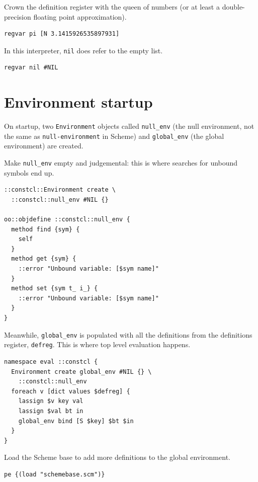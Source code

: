 \documentclass[twoside,9pt]{report}
\begin{document}
Crown the definition register with the queen of numbers (or at least a double-precision floating point approximation).

\begin{lstlisting}
regvar pi [N 3.1415926535897931]
\end{lstlisting}


In this interpreter, \texttt{nil} does refer to the empty list.

\begin{lstlisting}
regvar nil #NIL
\end{lstlisting}
\section{Environment startup}
\label{environment-startup}


On startup, two \texttt{Environment} objects called \texttt{null\_env} (the null environment, not the same as \texttt{null-environment} in Scheme) and \texttt{global\_env} (the global environment) are created.


Make \texttt{null\_env} empty and judgemental: this is where searches for unbound symbols end up.

\begin{lstlisting}
::constcl::Environment create \
  ::constcl::null_env #NIL {}

oo::objdefine ::constcl::null_env {
  method find {sym} {
    self
  }
  method get {sym} {
    ::error "Unbound variable: [$sym name]"
  }
  method set {sym t_ i_} {
    ::error "Unbound variable: [$sym name]"
  }
}
\end{lstlisting}


Meanwhile, \texttt{global\_env} is populated with all the definitions from the definitions register, \texttt{defreg}. This is where top level evaluation happens.

\begin{lstlisting}
namespace eval ::constcl {
  Environment create global_env #NIL {} \
    ::constcl::null_env
  foreach v [dict values $defreg] {
    lassign $v key val
    lassign $val bt in
    global_env bind [S $key] $bt $in
  }
}
\end{lstlisting}


Load the Scheme base to add more definitions to the global environment.

\index{schemebase}
\begin{lstlisting}
pe {(load "schemebase.scm")}
\end{lstlisting}
\end{document}
